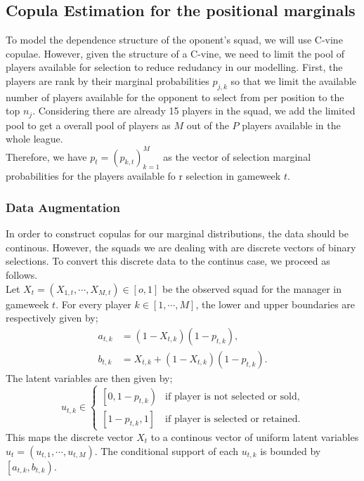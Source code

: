 \documentclass[12pt,oneside,a4paper]{book}
\theoremstyle{definition}
\theoremstyle{remark}
\begin{document}
				\subsection{Copula Estimation for the positional marginals}
				To model the dependence structure of the oponent's squad, we will use C-vine copulae.
				However, given the structure of a C-vine, we need to limit the pool of players available for selection to reduce redudancy in our modelling.
				First, the players are rank by their marginal probabilities $p_{j,k}$ so that we limit the available number of players available for the opponent to select from per position to the top $n_j$. Considering there are already 15 players in the squad, we add the limited pool to get a overall pool of players as $M$ out of the $P$ players available in the whole league.\\
				Therefore, we have $p_t = \left( p_{k,t}\right)_{k=1}^M$ as the vector of selection marginal probabilities for the players available fo r selection in gameweek $t$.
				\subsubsection{Data Augmentation}
				In order to construct copulas for our marginal distributions, the data should be continous. However, the squads we are dealing with are discrete vectors of binary selections. To convert this discrete data to the continus case, we proceed as follows.\\
				Let $X_t = \left( X_{1,t}, \cdots, X_{M,t} \right) \in \left[o,1\right]$ be the observed squad for the manager in gameweek $t$. For every player $k \in [1, \cdots, M]$, the lower and upper boundaries are respectively given by;
				\begin{equation}\label{Eq:latent_boundaries}
					\begin{aligned}
						a_{t,k} &= \left(1-X_{t,k}\right) \left(1-p_{t,k}\right),\\
						b_{t,k} &= X_{t,k} + \left(1-X_{t,k}\right) \left(1-p_{t,k}\right).
					\end{aligned}
				\end{equation}
				The latent variables are then given by;
				\begin{equation}\label{Eq:latent_variables}
					u_{t,k} \in
					\begin{cases}
						\left[0,1-p_{t,k}\right) & \text{if player is not selected or sold},\\
						\left[1-p_{t,k}, 1\right] &\text{if player is selected or retained}.
					\end{cases}
				\end{equation}
				This maps the discrete vector $X_t$ to a continous vector of uniform latent variables $u_{t} = \left(u_{t,1}, \cdots, u_{t,M}\right)$. The conditional support of each $u_{t,k}$ is bounded by $\left[a_{t,k},b_{t,k}\right)$.
\end{document}
